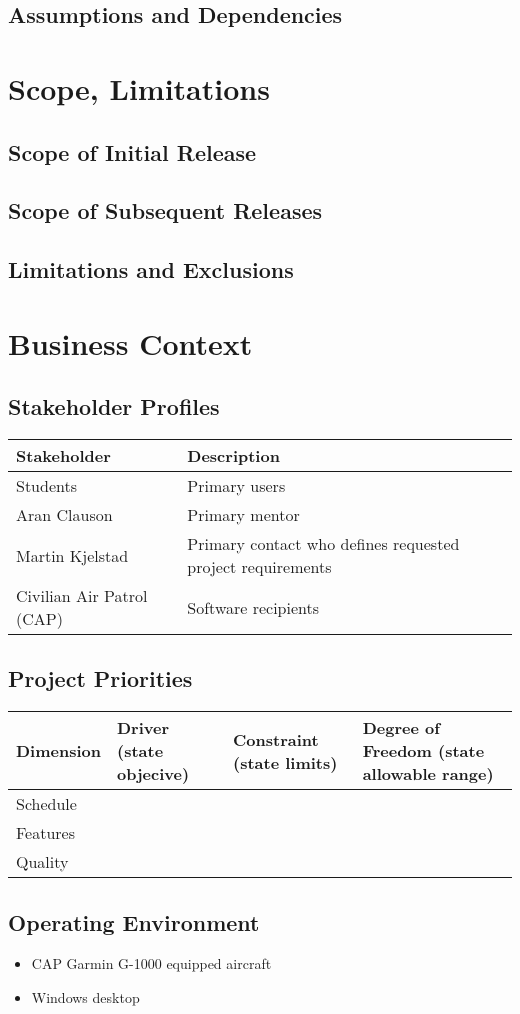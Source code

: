 \documentclass[12pt, letterpaper]{article}
\begin{document}
\subsection{Assumptions and Dependencies}

\section{Scope, Limitations}
\subsection{Scope of Initial Release}
\subsection{Scope of Subsequent Releases}
\subsection{Limitations and Exclusions}

\section{Business Context}
\subsection{Stakeholder Profiles}

\begin{tabular}{ |l|l| }
\hline
Stakeholder & Description \\ \hline \hline
Students & Primary users \\ \hline
Aran Clauson & Primary mentor \\ \hline
Martin Kjelstad & Primary contact who defines requested project requirements \\ \hline
Civilian Air Patrol (CAP) & Software recipients \\ \hline
\hline
\end{tabular}

\subsection{Project Priorities}

\begin{tabular} { |l|l|l|l| }
\hline
Dimension & Driver \newline (state objecive) & Constraint \newline(state limits) & Degree of Freedom \newline(state allowable range) \\
\hline
\hline
Schedule & & & \\ \hline
Features & & & \\ \hline
Quality & & & \\
\hline
\end{tabular}

\subsection{Operating Environment}

\begin{itemize}
	\item CAP Garmin G-1000 equipped aircraft
	\item Windows desktop
\end{itemize}

{}

\end{document}

